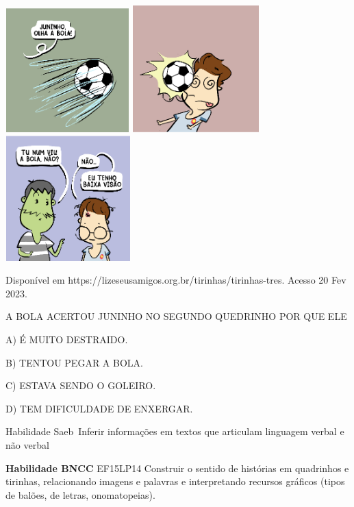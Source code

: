 \begin{escola}
\includegraphics[width=1.88542in,height=1.88542in]{media/image236.png}
\includegraphics[width=1.92708in,height=1.92708in]{media/image237.png}
\includegraphics[width=1.90625in,height=1.90625in]{media/image238.png}

Disponível em https://lizeseusamigos.org.br/tirinhas/tirinhas-tres.
Acesso 20 Fev 2023.

A BOLA ACERTOU JUNINHO NO SEGUNDO QUEDRINHO POR QUE ELE

A) É MUITO DESTRAIDO.

B) TENTOU PEGAR A BOLA.

C) ESTAVA SENDO O GOLEIRO.

D) TEM DIFICULDADE DE ENXERGAR.

Habilidade Saeb~Inferir informações em textos que articulam linguagem
verbal e não verbal

\textbf{Habilidade BNCC} EF15LP14 Construir o sentido de histórias em
quadrinhos e tirinhas, relacionando imagens e palavras e interpretando
recursos gráficos (tipos de balões, de letras, onomatopeias).


\end{escola}
